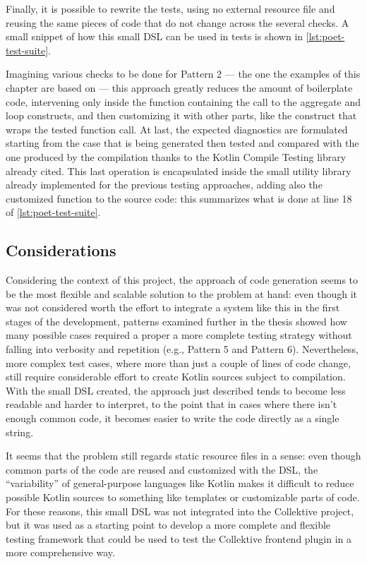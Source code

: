 \documentclass[12pt,a4paper,openright,twoside]{book}
\begin{document}
Finally, it is possible to rewrite the tests, using no external resource file
and reusing the same pieces of code that do not change across the several
checks. A small snippet of how this small \ac{DSL} can be used in tests is shown
in \cref{lst:poet-test-suite}.



Imagining various checks to be done for Pattern 2 --- the one the examples of
this chapter are based on --- this approach greatly reduces the amount of
boilerplate code, intervening only inside the function containing the call
to the aggregate and loop constructs, and then customizing it 
with other parts, like the  construct that wraps the 
tested function call. 
%
At last, the expected diagnostics are formulated starting from the case that is
being generated then tested and compared with the one produced by the compilation
thanks to the Kotlin Compile Testing library already cited. 
%
This last operation is encapsulated inside the small utility library already
implemented for the previous testing approaches, adding also the customized
function to the source code: this summarizes what is done at line 18 of
\cref{lst:poet-test-suite}.

\subsection{Considerations}

Considering the context of this project, the approach of code generation seems
to be the most flexible and scalable solution to the problem at hand: even
though it was not considered worth the effort to integrate a system like this in
the first stages of the development, patterns examined further in the thesis
showed how many possible cases required a proper a more complete testing
strategy without falling into verbosity and repetition (e.g., Pattern 5 and
Pattern 6).
%
Nevertheless, more complex test cases, where more than just a couple of lines of
code change, still require considerable effort to create Kotlin sources subject
to compilation. With the small \ac{DSL} created, the approach just described
tends to become less readable and harder to interpret, to the point that in
cases where there isn't enough common code, it becomes easier to write the code
directly as a single string.

It seems that the problem still regards static resource files in a sense: even
though common parts of the code are reused and customized with the \ac{DSL}, the
``variability'' of general-purpose languages like Kotlin makes it difficult to
reduce possible Kotlin sources to something like templates or customizable parts
of code.
%
For these reasons, this small \ac{DSL} was not integrated into the Collektive
project, but it was used as a starting point to develop a more complete and
flexible testing framework that could be used to test the Collektive frontend
plugin in a more comprehensive way. 
\end{document}
